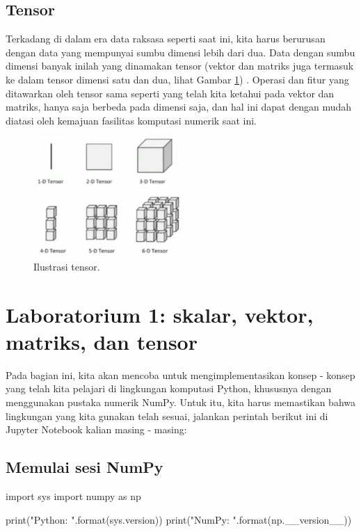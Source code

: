 \subsection{Tensor}
Terkadang di dalam era data raksasa seperti saat ini, kita harus berurusan dengan data yang mempunyai sumbu dimensi lebih dari dua. Data dengan sumbu dimensi banyak inilah yang dinamakan tensor (vektor dan matriks juga termasuk ke dalam tensor dimensi satu dan dua, lihat Gambar \ref{fig:fig1}) . Operasi dan fitur yang ditawarkan oleh tensor sama seperti yang telah kita ketahui pada vektor dan matriks, hanya saja berbeda pada dimensi saja, dan hal ini dapat dengan mudah diatasi oleh kemajuan fasilitas komputasi numerik saat ini.

\begin{figure}[H]
    \centering
    \includegraphics[width=0.5\textwidth]{gambar/gmb1.png}
    \caption{Ilustrasi tensor.}
    \label{fig:fig1}
\end{figure}

\section{Laboratorium 1: skalar, vektor, matriks, dan tensor}
Pada bagian ini, kita akan mencoba untuk mengimplementasikan konsep - konsep yang telah kita pelajari di lingkungan komputasi Python, khususnya dengan menggunakan pustaka numerik NumPy. Untuk itu, kita harus memastikan bahwa lingkungan yang kita gunakan telah sesuai, jalankan perintah berikut ini di Jupyter Notebook kalian masing - masing:

\subsection{Memulai sesi NumPy}
\begin{pyin}
import sys
import numpy as np

print("Python: {}".format(sys.version))
print("NumPy: {}".format(np.__version__))
\end{pyin}

